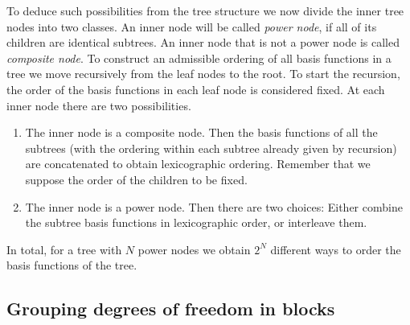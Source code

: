 \documentclass[a4paper,10pt,headings=normal,bibliography=totoc]{scrartcl}
\begin{document}
To deduce such possibilities from the tree structure we now divide the inner tree nodes into two classes.
An inner node will be called {\em power node}, if all of its children are identical subtrees.
An inner node that is not a power node is called {\em composite node}.  To construct an admissible ordering
of all basis functions in a tree we move recursively from the leaf nodes to the root.  To start the recursion,
the order of the basis functions in each leaf node is considered fixed.  At each inner node there are two
possibilities.
\begin{enumerate}
 \item The inner node is a composite node.  Then the basis functions of all the subtrees (with the ordering
   within each subtree already given by recursion) are concatenated to obtain lexicographic ordering.
   Remember that we suppose the order of the children to be fixed.
 \item The inner node is a power node.  Then there are two choices: Either combine the subtree basis functions
   in lexicographic order, or interleave them.
\end{enumerate}
In total, for a tree with $N$ power nodes we obtain $2^N$ different ways to order the basis functions of the tree.



\subsection{Grouping degrees of freedom in blocks}
\label{sec:dune_functions:blocking}
\end{document}
